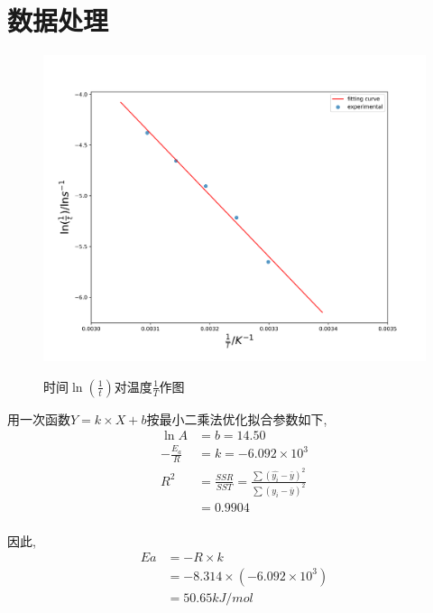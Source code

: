 \documentclass[a4paper]{article}
\begin{document}
\section{数据处理}
\begin{figure}[!h]
	\centering
	\includegraphics[width=0.50\paperwidth]{fig/experiment.png}\\
	\caption{时间$\ln(\frac{1}{t})$对温度$\frac{1}{T}$作图}
\end{figure}
\par
用一次函数$Y = k\times X + b$按最小二乘法优化拟合参数如下,
\begin{equation}
	\begin{aligned}
		\ln A &= b = 14.50\\
		-\frac{E_{a}}{R} &= k = -6.092\times 10^{3}\\
		R^{2} &= \frac{SSR}{SST} = \frac{\sum{(\hat{y_{i}}-\bar{y})^{2}}}{\sum{(y_{i}-\bar{y})^{2}}}\\
					&=0.9904\\
	\end{aligned}
\end{equation}
\par
因此,
\begin{equation}
	\begin{aligned}
		Ea &= -R\times k\\
			 &= -8.314 \times (-6.092 \times 10^{3})\\
			 &= 50.65 kJ/mol\\
	\end{aligned}
\end{equation}
\newpage
\end{document}

